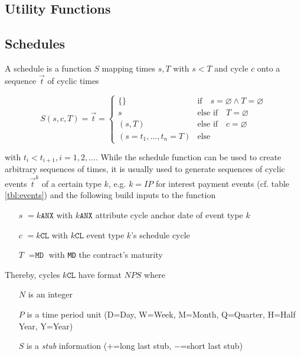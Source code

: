 \documentclass[9pt,oneside]{amsart}
\newcommand{\attr}[1]{\texttt{#1}}
\newcommand{\sdl}[3]{S(#1,#2,#3)}
\newcommand{\undef}{\varnothing}
\begin{document}
\begin{multicols}{2}

\section{Utility Functions}

\subsection{Schedules}\label{sec:schedules}

A schedule is a function $S$ mapping times $s,T$ with $s<T$ and cycle $c$ onto a sequence $\vec{t}$ of cyclic times

\[
	\sdl{s}{c}{T}=\vec{t}=\begin{cases} \{\} & \text{if}\quad s=\undef\land T=\undef\\ 
					s & \text{else if}\quad T=\undef\\
					(s,T) & \text{else if}\quad c=\undef\\
					(s=t_1,...,t_n=T) & \text{else} \end{cases}
\]

with $t_i<t_{i+1}, i=1,2,...$. While the schedule function can be used to create arbitrary sequences of times, it is usually used to generate sequences of cyclic events $\vec{t}^k$ of a certain type $k$, e.g. $k=IP$ for interest payment events (cf. table \ref{tbl:events}) and the following build inputs to the function

\begin{itemize}
	\item[$s$] $=k\attr{ANX}$ with $k\attr{ANX}$ attribute cycle anchor date of event type $k$
	
	\item[$c$] $=k\attr{CL}$ with $k\attr{CL}$ event type $k$'s schedule cycle
	
	\item[$T$] $=\attr{MD}$ with \attr{MD} the contract's maturity
\end{itemize}

Thereby, cycles $k\attr{CL}$ have format $NPS$ where 

\begin{itemize}
	\item[$N$] is an integer
	\item[$P$] is a time period unit (D=Day, W=Week, M=Month, Q=Quarter, H=Half Year, Y=Year)
	\item[$S$] is a \textit{stub} information ($+$=long last stub, $-$=short last stub)
\end{itemize}


\end{multicols}
\end{document}
